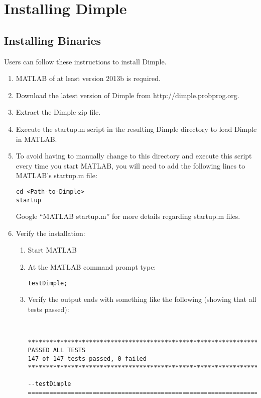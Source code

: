 \section{Installing Dimple}


\subsection{Installing Binaries}

Users can follow these instructions to install Dimple.

\ifmatlab

\begin{enumerate}
\item MATLAB of at least version 2013b is required.
\item Download the latest version of Dimple from http://dimple.probprog.org.
\item Extract the Dimple zip file.
\item Execute the startup.m script in the resulting Dimple directory to 
load Dimple in MATLAB.
\item To avoid having to manually change to this directory and execute 
this script every time you start MATLAB, you will need to add the following lines to MATLAB's startup.m file:
\begin{lstlisting}
cd <Path-to-Dimple>
startup
\end{lstlisting}
Google ``MATLAB startup.m'' for more details regarding startup.m files.
\item Verify the installation:
\begin{enumerate}
\item Start MATLAB
\item  At the MATLAB command prompt type:
\begin{lstlisting} 
testDimple;
\end{lstlisting}
\item Verify the output ends with something like the following (showing that all tests passed): \\
\begin{minipage}{\textwidth}
\begin{lstlisting} 


**********************************************************************
PASSED ALL TESTS
147 of 147 tests passed, 0 failed
**********************************************************************

--testDimple
======================================================================
\end{lstlisting}
\end{minipage}

\end{enumerate}
\end{enumerate}

